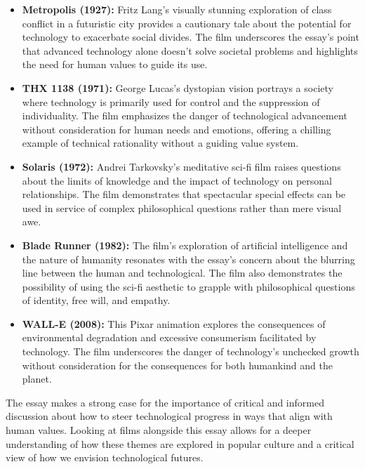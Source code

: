 \documentclass[11pt,fleqn]{book} %
\begin{document}
\begin{itemize}
\item \textbf{Metropolis (1927):} Fritz Lang's visually stunning exploration of class conflict in a futuristic city provides a cautionary tale about the potential for technology to exacerbate social divides. The film underscores the essay's point that advanced technology alone doesn't solve societal problems and highlights the need for human values to guide its use.

\item \textbf{THX 1138 (1971):} George Lucas's dystopian vision portrays a society where technology is primarily used for control and the suppression of individuality.  The film emphasizes the danger of technological advancement without consideration for human needs and emotions, offering a chilling example of technical rationality without a guiding value system.

\item \textbf{Solaris (1972):} Andrei Tarkovsky's meditative sci-fi film raises questions about the limits of knowledge and the impact of technology on personal relationships. The film demonstrates that spectacular special effects can be used in service of complex philosophical questions rather than mere visual awe.

\item \textbf{Blade Runner (1982):} The film's exploration of artificial intelligence and the nature of humanity resonates with the essay's concern about the blurring line between the human and technological. The film also demonstrates the possibility of using the sci-fi aesthetic to grapple with philosophical questions of identity, free will, and empathy.

\item \textbf{WALL-E (2008):} This Pixar animation explores the consequences of environmental degradation and excessive consumerism facilitated by technology. The film underscores the danger of technology's unchecked growth without consideration for the consequences for both humankind and the planet. 
\end{itemize}

\vspace{5pt}

The essay makes a strong case for the importance of critical and informed discussion about how to steer technological progress in ways that align with human values.  Looking at films alongside this essay allows for a deeper understanding of how these themes are explored in popular culture and a critical view of how we envision technological futures. 
\end{document}

